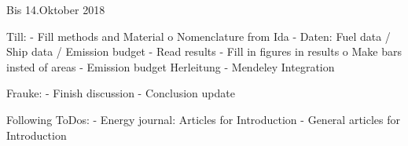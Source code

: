 Bis 14.Oktober 2018

Till:
- Fill methods and Material
    o   Nomenclature from Ida
- Daten: Fuel data / Ship data / Emission budget
- Read results
- Fill in figures in results
    o   Make bars insted of areas
- Emission budget Herleitung
- Mendeley Integration

Frauke:
-	Finish discussion
-	Conclusion update

Following ToDos:
-	Energy journal: Articles for Introduction
-	General articles for Introduction
